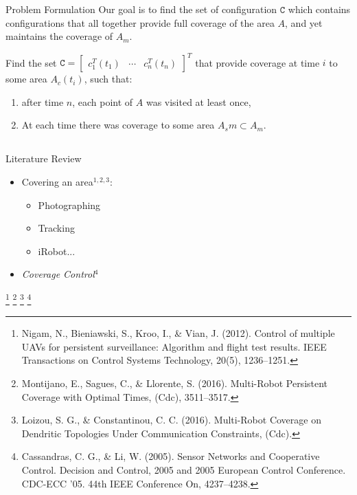 \documentclass[t]{beamer}
\newcommand{\bmat}[1]{\begin{bmatrix}#1\end{bmatrix}}
\begin{document}
\begin{frame}[label=formulation3]{Problem Formulation}
Our goal is to find the set of configuration $\texttt{C}$ which contains configurations that all together provide full coverage of the area $A$, and yet maintains the coverage of $A_m$.

\begin{problem} \label{GeneralProblem}
Find the set $\texttt{C} = \bmat{
c_{1}^{T}\left(t_1\right)&\cdots&c_{n}^{T}\left(t_n\right)}^{T}$ that provide coverage at time $i$ to some area $A_c \left( t_i \right)$, such that:
\begin{enumerate}
\item after time $n$, each point of $A$ was visited at least once,
\item At each time there was coverage to some area $A_sm \subset A_m$.
\end{enumerate}
\end{problem}
\end{frame}

\subsection[Literature Review]{}
\begin{frame}[label=litrev1]{Literature Review}
\begin{itemize}
\item<1-> Covering an area$^{1,2,3}$: \begin{itemize}
\item<2-> Photographing
\item<2-> Tracking
\item<2-> iRobot...
\end{itemize}
\item<3-> \textit{Coverage Control}$^{4}$
\end{itemize}

\footnote[1]{\tiny Nigam, N., Bieniawski, S., Kroo, I., \& Vian, J. (2012). Control of multiple UAVs for persistent surveillance: Algorithm and flight test results. IEEE Transactions on Control Systems Technology, 20(5), 1236–1251.}
\footnote[2]{\tiny Montijano, E., Sagues, C., \& Llorente, S. (2016). Multi-Robot Persistent Coverage with Optimal Times, (Cdc), 3511–3517.}
\footnote[3]{\tiny Loizou, S. G., \& Constantinou, C. C. (2016). Multi-Robot Coverage on Dendritic Topologies Under Communication Constraints, (Cdc).}
\footnote[4]{\tiny Cassandras, C. G., \& Li, W. (2005). Sensor Networks and Cooperative Control. Decision and Control, 2005 and 2005 European Control Conference. CDC-ECC ’05. 44th IEEE Conference On, 4237–4238.}
\end{frame}
\end{document}
